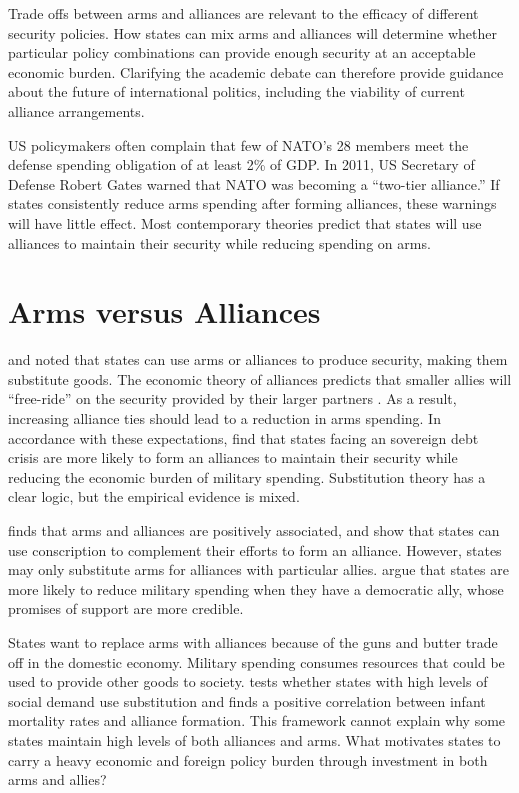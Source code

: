 \documentclass[12pt]{article}
\begin{document}
Trade offs between arms and alliances are relevant to the efficacy of different security policies. How states can mix arms and alliances will determine whether particular policy combinations can provide enough security at an acceptable economic burden. Clarifying the academic debate can therefore provide guidance about the future of international politics, including the viability of current alliance arrangements. 

US policymakers often complain that few of NATO's 28 members meet the defense spending obligation of at least 2\% of GDP. In 2011, US Secretary of Defense Robert Gates warned that NATO was becoming a ``two-tier alliance.'' If states consistently reduce arms spending after forming alliances, these warnings will have little effect. Most contemporary theories predict that states will use alliances to maintain their security while reducing spending on arms. 


\section*{Arms versus Alliances}


\citet{Altfield1984} and \citet{Morrow1993} noted that states can use arms or alliances to produce security, making them substitute goods. The economic theory of alliances predicts that smaller allies will ``free-ride'' on the security provided by their larger partners \citep{OlsonZeckhauser1966, SandlerHartley2001, Lake2009}. As a result, increasing alliance ties should lead to a reduction in arms spending. In accordance with these expectations, \citet{AllenDigiuseppe2013} find that states facing an sovereign debt crisis are more likely to form an alliances to maintain their security while reducing the economic burden of military spending. Substitution theory has a clear logic, but the empirical evidence is mixed. 

\citet{Diehl1994} finds that arms and alliances are positively associated, and \citet{Horowitzetal2017} show that states can use conscription to complement their efforts to form an alliance. However, states may only substitute arms for alliances with particular allies. \citet{DigiuseppePoast2016} argue that states are more likely to reduce military spending when they have a democratic ally, whose promises of support are more credible. 

States want to replace arms with alliances because of the guns and butter trade off in the domestic economy. Military spending consumes resources that could be used to provide other goods to society. \citet{Kimball2010} tests whether states with high levels of social demand use substitution and finds a positive correlation between infant mortality rates and alliance formation. This framework cannot explain why some states maintain high levels of both alliances and arms. What motivates states to carry a heavy economic and foreign policy burden through investment in both arms and allies? 
\end{document}
